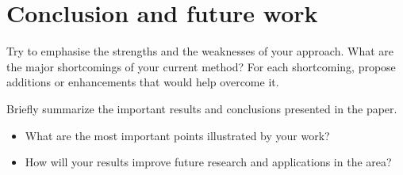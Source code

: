 \documentclass[runningheads,a4paper,11pt]{report}
\begin{document}
\chapter{Conclusion and future work}
\label{chapter:concl}

Try to emphasise the strengths and the weaknesses of your approach.
What are the major shortcomings of your current method? For each shortcoming, propose additions or enhancements that would help overcome it. 

Briefly summarize the important results and conclusions presented in the paper. 

\begin{itemize}
	\item What are the most important points illustrated by your work? 
	\item How will your results improve future research and applications in the area? 
\end{itemize}






\end{document}

